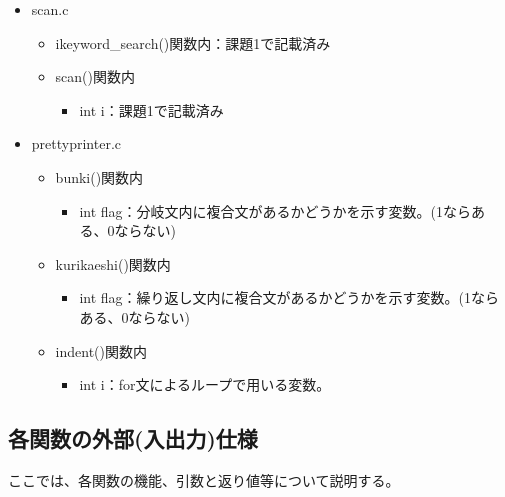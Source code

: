 \documentclass{jarticle}
\begin{document}
\begin{itemize}
  \item scan.c
  \begin{itemize}
    \item ikeyword\_search()関数内：課題1で記載済み
    \item scan()関数内
    \begin{itemize}
      \item int i：課題1で記載済み
    \end{itemize}
  \end{itemize}
  \item prettyprinter.c
  \begin{itemize}
    \item bunki()関数内
    \begin{itemize}
      \item int flag：分岐文内に複合文があるかどうかを示す変数。(1ならある、0ならない)
    \end{itemize}
    \item kurikaeshi()関数内
    \begin{itemize}
      \item
      int
      flag：繰り返し文内に複合文があるかどうかを示す変数。(1ならある、0ならない)
    \end{itemize}
    \item indent()関数内
    \begin{itemize}
      \item int i：for文によるループで用いる変数。
    \end{itemize}
  \end{itemize}
\end{itemize}
\subsection{各関数の外部(入出力)仕様}
ここでは、各関数の機能、引数と返り値等について説明する。
\end{document}

